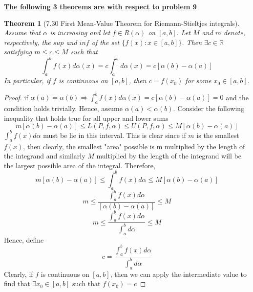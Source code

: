 \documentclass[aps,pra,notitlepage,amsmath,amssymb,letterpaper,12pt]{revtex4-1}
\newtheorem{theorem}{Theorem}
\begin{document}
\underline{\textbf{The following 3 theorems are with respect to problem 9}}
\begin{theorem}[7.30 First Mean-Value Theorem for Riemann-Stieltjes integrals]
Assume that $\alpha$ is increasing and let $f \in R(\alpha)$ on $[a,b]$. Let $M$ and $m$ denote, respectively, the $sup$ and $inf$ of the set $\{f(x):x \in [a,b]\}$. Then $\exists c \in \mathbb{R}$ satisfying $m \leq c \leq M$ such that
\[\int_{a}^{b}f(x)d\alpha(x) = c\int_{a}^{b}d\alpha(x) = c[\alpha(b)-\alpha(a)]\]
In particular, if $f$ is continuous on $[a,b]$, then $c=f(x_{0})$ for some $x_{0} \in [a,b]$.
\end{theorem}
\begin{proof}
if $\alpha(a) = \alpha(b) \Rightarrow \int_{a}^{b}f(x)d\alpha(x) = c[\alpha(b)-\alpha(a)] = 0$ and the condition holds trivially. Hence, assume $\alpha(a) < \alpha(b)$. Consider the following inequality that holds true for all upper and lower sums
\[m[\alpha(b) - \alpha(a)] \leq L(P,f,\alpha) \leq U(P,f,\alpha) \leq M[\alpha(b) - \alpha(a)]\]
$\int_{a}^{b}f(x)d\alpha$ must be lie in this interval. This is clear since if $m$ is the smallest $f(x)$, then clearly, the smallest "area" possible is m multiplied by the length of the integrand and similarly $M$ multiplied by the length of the integrand will be the largest possible area of the integral. Therefore,
\[m[\alpha(b) - \alpha(a)] \leq \int_{a}^{b}f(x)d\alpha \leq M[\alpha(b) - \alpha(a)]\]
\[m \leq \frac{\int_{a}^{b}f(x)d\alpha}{[\alpha(b) - \alpha(a)]} \leq M\]
\[m \leq \frac{\int_{a}^{b}f(x)d\alpha}{\int_{a}^{b}d\alpha} \leq M\]
Hence, define
$$c = \frac{\int_{a}^{b}f(x)d\alpha}{\int_{a}^{b}d\alpha}$$
Clearly, if $f$ is continuous on $[a,b]$, then we can apply the intermediate value to find that $\exists x_{0} \in [a,b] \textrm{ such that } f(x_{0}) = c$
\newline{}
\end{proof}
\end{document}
